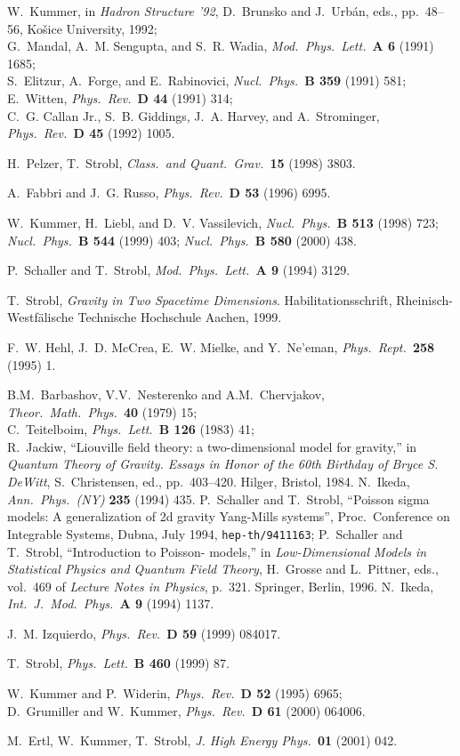 \documentclass[a4paper,10pt]{article}
\renewcommand{\^}{{}^}
\renewcommand{\_}{\!{}_}
\providecommand\ap[3]    
		{{\it Ann.\ Phys.\ (NY) }{\bf #1} (#2) #3}
\providecommand\cqg[3]  
		{{\it Class.\ and Quant.\ Grav.\ }{\bf #1} (#2) #3}
\providecommand\ijmpa[3] 
		{{\it Int.\ J.\ Mod.\ Phys.\ }{\bf A #1} (#2) #3}
\providecommand\jhep[3]  
		{{\it J. High Energy Phys.\ }{\bf #1} (#2) #3}
\providecommand\mpla[3]  
		{{\it Mod.\ Phys.\ Lett.\ }{\bf A #1} (#2) #3}
\providecommand\npb[3]   
		{{\it Nucl.\ Phys.\ }{\bf B #1} (#2) #3}
\providecommand\plb[3]   
		{{\it Phys.\ Lett.\ }{\bf B #1} (#2) #3}
\providecommand\prd[3]   
		{{\it Phys.\ Rev.\ }{\bf D #1} (#2) #3}
\providecommand\prep[3]  
		{{\it Phys.\ Rept.\ }{\bf #1} (#2) #3}
\providecommand\tmp[3]
		{{\it Theor.\ Math.\ Phys.\ }{\bf #1} (#2) #3}
\begin{document}
\begin{thebibliography}{99}
W.~Kummer, 
in {\em Hadron Structure '92}, D.~Brunsko and J.~Urb\'an, eds.,
  pp.~48--56, 
\newblock Ko\v sice University, 1992; \\

G.~Mandal, A.~M. Sengupta, and S.~R. Wadia, 
\mpla{6}{1991}{1685}; \\
S.~Elitzur, A.~Forge, and E.~Rabinovici, 
\npb{359}{1991}{581}; \\
E.~Witten, \prd{44}{1991}{314}; \\
C.~G. {Callan Jr.}, S.~B. Giddings, J.~A. Harvey, and A.~Strominger,
\prd{45}{1992}{1005}. 

H.\ Pelzer, T.\ Strobl, \cqg{15}{1998}{3803}. 

A.~Fabbri and J.~G. Russo, \prd{53}{1996}{6995}.  

W.~Kummer, H.~Liebl, and D.~V. Vassilevich, 
\npb{513}{1998}{723}; 
\npb{544}{1999}{403};  
\npb{580}{2000}{438}.  

P.~Schaller and T.~Strobl, \mpla{9}{1994}{3129}.  

T.~Strobl, {\em Gravity in Two Spacetime Dimensions}.
\newblock Habilitationsschrift, Rheinisch-Westf\"alische Technische Hochschule
  Aachen, 1999.

F.~W. Hehl, J.~D. McCrea, E.~W. Mielke, and Y.~Ne{'e}man, 
\prep{258}{1995}{1}. 

B.M.\ Barbashov, V.V.\ Nesterenko and A.M.\ Chervjakov, 
\tmp{40}{1979}{15}; \\
C.\ Teitelboim, \plb{126}{1983}{41}; \\
R.~Jackiw, ``{L}iouville field theory: a two-dimensional model for gravity,''
  in {\em Quantum Theory of Gravity. Essays in Honor of the 60th Birthday of
  Bryce S. DeWitt}, S.~Christensen, ed., pp.~403--420.
\newblock Hilger, Bristol, 1984.
N.\ Ikeda, \ap{235}{1994}{435}. 
P.~Schaller and T.~Strobl, ``{P}oisson sigma models: {A} generalization of 2d
  gravity {Y}ang-{M}ills systems'', Proc.\ Conference on 
  Integrable Systems, Dubna, July 1994, 
  \texttt{hep-th/9411163}; 
P.~Schaller and T.~Strobl, ``Introduction to {Poisson-\myHighlight{$\sigma$}\coordHE{}} models,'' in
  {\em Low-Dimensional Models in Statistical Physics and Quantum Field Theory},
  H.~Grosse and L.~Pittner, eds., vol.~469 of {\em Lecture Notes in Physics},
  p.~321.
\newblock Springer, Berlin, 1996.
N.\ Ikeda, \ijmpa{9}{1994}{1137}. 

J.~M. Izquierdo, \prd{59}{1999}{084017}.

T.~Strobl, \plb{460}{1999}{87}. 

W.~Kummer and P.~Widerin, \prd{52}{1995}{6965};\\ 
D.~Grumiller and W.~Kummer, 
\prd{61}{2000}{064006}.  

M.\ Ertl, W.\ Kummer, T.\ Strobl,  
\jhep{01}{2001}{042}. 

\end{thebibliography}
\end{document}
